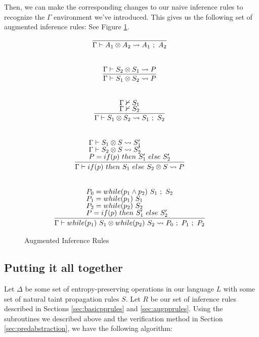 \documentclass[letterpaper,twocolumn,10pt]{article}
\newcommand{\cross}{\otimes{}}
\begin{document}
Then, we can make the corresponding changes to our naive inference rules to recognize the $\Gamma$ environment we've introduced. This gives us the following set of augmented inference rules: See Figure \ref{fig:auginfrules2}.

\begin{figure}
    \caption{Augmented Inference Rules}
    \label{fig:auginfrules2}
    \[
		\begin{array}{c}
			\infer[]{\Gamma \vdash A_1 \cross A_2 \leadsto A_1\ ;\ A_2}{} \\ \\ \\
			\infer[]{\Gamma \vdash S_1 \cross S_2 \leadsto P}{
				\Gamma \vdash S_2 \cross S_1 \leadsto P
			} \\ \\ \\
			\infer[]{\Gamma \vdash S_1 \cross S_2 \leadsto S_1\ ;\ S_2}{
				\Gamma \nvdash S_1 \\
				\Gamma \nvdash S_2
			} \\ \\ \\
			\infer[]{\Gamma \vdash if(p)\ then\ S_1\ else\ S_2 \cross S \leadsto P}{
				\text{$\Gamma \vdash S_1 \cross S \leadsto S_1'$} \\
				\text{$\Gamma \vdash S_2 \cross S \leadsto S_2'$} \\
				\text{$P = if(p)\ then\ S_1'\ else\ S_2'$}
			} \\ \\ \\
			\infer[]{\Gamma \vdash while(p_1)\ S_1 \cross while(p_2)\ S_2 \leadsto P_0\ ;\ P_1\ ;\ P_2}{
				\text{$P_0 = while(p_1 \land p_2)\ S_1\ ;\ S_2$} \\
				\text{$P_1 = while(p_1)\ S_1$} \\
				\text{$P_2 = while(p_2)\ S_2$} \\
				\text{$P = if(p)\ then\ S_1'\ else\ S_2'$}
			}
		\end{array}
    \]
\end{figure}


\subsection{Putting it all together}

Let $\Delta$ be some set of entropy-preserving operations in our language $L$ with some set of 
natural taint propagation rules $S$.
Let $R$ be our set of inference rules described in Sections \ref{sec:basicpprules} and \ref{sec:augpprules}.
Using the subroutines we described above and the verification method in Section
\ref{sec:predabstraction}, we have the following algorithm:
\end{document}
